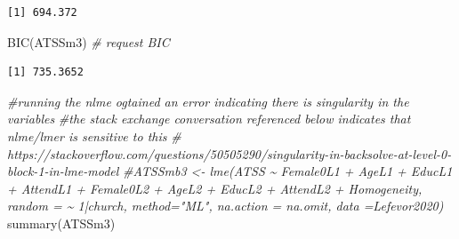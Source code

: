 \documentclass[
  english,
]{book}
\newenvironment{Shaded}{\begin{snugshade}}{\end{snugshade}}
\newcommand{\CommentTok}[1]{\textcolor[rgb]{0.56,0.35,0.01}{\textit{#1}}}
\newcommand{\FunctionTok}[1]{\textcolor[rgb]{0.00,0.00,0.00}{#1}}
\newcommand{\NormalTok}[1]{#1}
\begin{document}
\begin{verbatim}
[1] 694.372
\end{verbatim}

\begin{Shaded}
\begin{Highlighting}[]
\FunctionTok{BIC}\NormalTok{(ATSSm3) }\CommentTok{\# request BIC}
\end{Highlighting}
\end{Shaded}

\begin{verbatim}
[1] 735.3652
\end{verbatim}

\begin{Shaded}
\begin{Highlighting}[]
\CommentTok{\#running the nlme ogtained an error indicating there is singularity in the variables}
\CommentTok{\#the stack exchange conversation referenced below indicates that nlme/lmer is sensitive to this}
\CommentTok{\# https://stackoverflow.com/questions/50505290/singularity{-}in{-}backsolve{-}at{-}level{-}0{-}block{-}1{-}in{-}lme{-}model }
\CommentTok{\#ATSSmb3 \textless{}{-} lme(ATSS \textasciitilde{}  Female0L1 + AgeL1 + EducL1 + AttendL1 + Female0L2 + AgeL2 + EducL2 + AttendL2 + Homogeneity, random = \textasciitilde{} 1|church, method="ML", na.action = na.omit, data =Lefevor2020)}
\FunctionTok{summary}\NormalTok{(ATSSm3)}
\end{Highlighting}
\end{Shaded}
\end{document}
